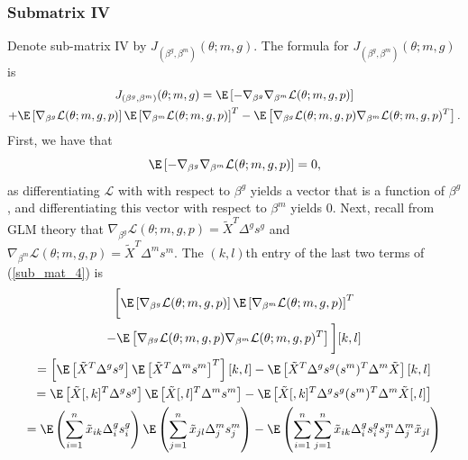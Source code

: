 \documentclass[11pt]{article}
\begin{document}
\begin{appendices}
\begin{refsection}
\subsubsection*{Submatrix IV}
Denote sub-matrix IV by $J_{(\beta^g, \beta^m)}(\theta; m, g)$. The formula for $J_{(\beta^g, \beta^m)}(\theta; m, g)$ is 
\begin{multline}\label{sub_mat_4}
J_{(\beta^g, \beta^m)}(\theta; m,g) = \E \left[-\nabla_{\beta^g} \nabla_{\beta^m} \mathcal{L}(\theta; m, g, p) \right] \\ + \E\left[ \nabla_{\beta^{g}}\mathcal{L}(\theta ; m,g,p) \right] \E \left[\nabla_{\beta^m}\mathcal{L} (\theta ; m,g,p)  \right]^T - \E \left[ \nabla_{\beta^{g}}\mathcal{L} (\theta; m,g,p) \nabla_{\beta^m}\mathcal{L}(\theta; m,g,p)^T  \right].
\end{multline}
First, we have that
\begin{equation}\label{sub_mat_4_1}
\E\left[-\nabla_{\beta^g} \nabla_{\beta^m} \mathcal{L}(\theta; m, g, p) \right] = 0,
\end{equation}
as differentiating $\mathcal{L}$ with with respect to $\beta^g$ yields a vector that is a function of $\beta^g$, and differentiating this vector with respect to $\beta^m$ yields $0$. Next, recall from GLM theory that $\nabla_{\beta^g} \mathcal{L}(\theta; m, g, p) =   \tilde{X}^T\Delta^g s^g$ and $\nabla_{\beta^m} \mathcal{L}(\theta; m, g, p) = \tilde{X}^T \Delta^m s^m.$ The $(k,l)$th entry of the last two terms of (\ref{sub_mat_4}) is
\begin{multline}\label{sub_mat_4_2}
\bigg[ \E \left[\nabla_{\beta^g} \mathcal{L}(\theta; m, g, p) \right] \E \left[\nabla_{\beta^m} \mathcal{L}(\theta; m, g, p) \right]^T \\ - \E \left[ \nabla_{\beta^g} \mathcal{L}(\theta; m, g, p) \nabla_{\beta^m} \mathcal{L}(\theta; m, g, p)^T \right] \bigg][k,l] \\ 
= \left[ \E \left[ \tilde{X}^T \Delta^g s^g \right]\E \left[ \tilde{X}^T \Delta^m s^m \right]^T\right][k,l] - \E \left[ \tilde{X}^T \Delta^g s^g (s^m)^T \Delta^m \tilde{X} \right][k,l] \\ 
= \E\left[\tilde{X}[,k]^T \Delta^g s^g \right] \E \left[\tilde{X}[,l]^T \Delta^m s^m \right] - \E \left[\tilde{X}[,k]^T \Delta^g s^g (s^m)^T \Delta^m \tilde{X}[,l ] \right] \\
=\E\left( \sum_{i=1}^n \tilde{x}_{ik} \Delta^g_i s^g_i \right) \E \left( \sum_{j=1}^n \tilde{x}_{jl} \Delta^m_j s^m_j \right) - \E \left( \sum_{i=1}^n \sum_{j=1}^n \tilde{x}_{ik} \Delta^g_i s^g_i s^m_j \Delta^m_j \tilde{x}_{jl} \right) \\ 

\end{multline}
\end{refsection}
\end{appendices}
\end{document}
